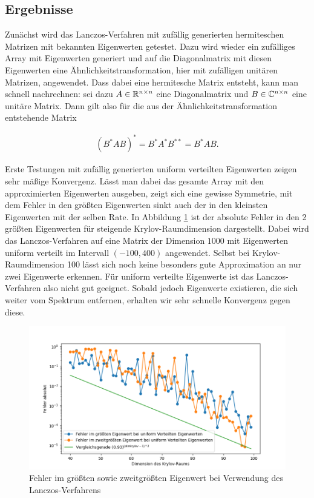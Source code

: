 \documentclass{article}
\theoremstyle{plain}
\begin{document}
\subsection{Ergebnisse}\label{ergebnisse}

Zunächst wird das Lanczos-Verfahren mit zufällig generierten hermiteschen Matrizen mit bekannten Eigenwerten getestet. Dazu wird wieder ein zufälliges Array mit Eigenwerten generiert und auf die Diagonalmatrix mit diesen Eigenwerten eine Ähnlichkeitstransformation, hier mit zufälligen unitären Matrizen, angewendet. Dass dabei eine hermitesche Matrix entsteht, kann man schnell nachrechnen: sei dazu $A \in \mathbb{R}^{n\times n}$ eine Diagonalmatrix und $B \in \mathbb{C}^{n\times n}$ eine unitäre Matrix. Dann gilt also für die aus der Ähnlichkeitstransformation entstehende Matrix

\begin{align*}
	(B^* A B)^*
	=
	B^* A^* B^{**}
	=
		B^* A B.
\end{align*}

Erste Testungen mit zufällig generierten uniform verteilten Eigenwerten zeigen sehr mäßige Konvergenz. Lässt man dabei das gesamte Array mit den approximierten Eigenwerten ausgeben, zeigt sich eine gewisse Symmetrie, mit dem Fehler in den größten Eigenwerten sinkt auch der in den kleinsten Eigenwerten mit der selben Rate. In Abbildung \ref{error_uniform} ist der absolute Fehler in den 2 größten Eigenwerten für steigende Krylov-Raumdimension dargestellt. Dabei wird das Lanczos-Verfahren auf eine Matrix der Dimension $1000$ mit Eigenwerten uniform verteilt im Intervall $(-100,400)$ angewendet. Selbst bei Krylov-Raumdimension 100 lässt sich noch keine besonders gute Approximation an nur zwei Eigenwerte erkennen. Für uniform verteilte Eigenwerte ist das Lanczos-Verfahren also nicht gut geeignet. Sobald jedoch Eigenwerte existieren, die sich weiter vom Spektrum entfernen, erhalten wir sehr schnelle Konvergenz gegen diese.

\begin{figure}[H]\label{error_uniform}
\begin{center}

	\includegraphics[width = 0.6 \linewidth]{Plots/error_uniform}
	\caption{Fehler im größten sowie zweitgrößten Eigenwert bei Verwendung des Lanczos-Verfahrens}
	\end{center}
\end{figure}
\end{document}
